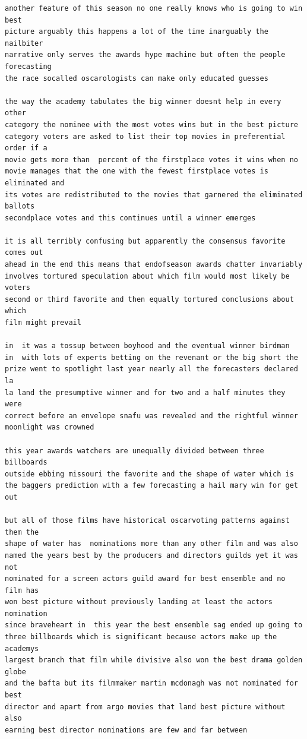 \documentclass[12pt]{article}
\begin{document}
\begin{verbatim}
another feature of this season no one really knows who is going to win best
picture arguably this happens a lot of the time inarguably the nailbiter
narrative only serves the awards hype machine but often the people forecasting
the race socalled oscarologists can make only educated guesses

the way the academy tabulates the big winner doesnt help in every other
category the nominee with the most votes wins but in the best picture
category voters are asked to list their top movies in preferential order if a
movie gets more than  percent of the firstplace votes it wins when no
movie manages that the one with the fewest firstplace votes is eliminated and
its votes are redistributed to the movies that garnered the eliminated ballots
secondplace votes and this continues until a winner emerges

it is all terribly confusing but apparently the consensus favorite comes out
ahead in the end this means that endofseason awards chatter invariably
involves tortured speculation about which film would most likely be voters
second or third favorite and then equally tortured conclusions about which
film might prevail

in  it was a tossup between boyhood and the eventual winner birdman
in  with lots of experts betting on the revenant or the big short the
prize went to spotlight last year nearly all the forecasters declared la
la land the presumptive winner and for two and a half minutes they were
correct before an envelope snafu was revealed and the rightful winner
moonlight was crowned

this year awards watchers are unequally divided between three billboards
outside ebbing missouri the favorite and the shape of water which is
the baggers prediction with a few forecasting a hail mary win for get out

but all of those films have historical oscarvoting patterns against them the
shape of water has  nominations more than any other film and was also
named the years best by the producers and directors guilds yet it was not
nominated for a screen actors guild award for best ensemble and no film has
won best picture without previously landing at least the actors nomination
since braveheart in  this year the best ensemble sag ended up going to
three billboards which is significant because actors make up the academys
largest branch that film while divisive also won the best drama golden globe
and the bafta but its filmmaker martin mcdonagh was not nominated for best
director and apart from argo movies that land best picture without also
earning best director nominations are few and far between
\end{verbatim}
\end{document}
